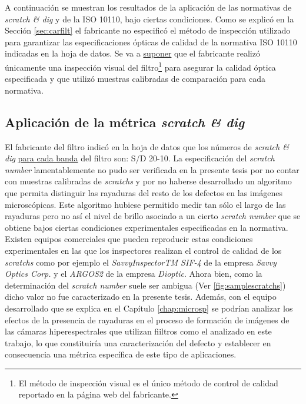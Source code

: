 A continuación se muestran los resultados de la aplicación de las normativas de \textit{scratch \& dig} y de la ISO 10110, bajo ciertas condiciones. Como se explicó en la Sección \ref{sec:carfilt} el fabricante no especificó el método de inspección utilizado para garantizar las especificaciones ópticas de calidad de la normativa ISO 10110 indicadas en la hoja de datos. Se va a \underline{suponer} que el fabricante realizó únicamente una inspección visual del filtro\footnote{El método de inspección visual es el único método de control de calidad reportado en la página web del fabricante.} para asegurar la calidad óptica especificada y que utilizó muestras calibradas de comparación para cada normativa.

\singlespacing
\subsection{Aplicación de la métrica \textit{scratch \& dig}}

\hspace{0.5cm}El fabricante del filtro indicó en la hoja de datos que los números de \textit{scratch \& dig} \underline{para cada banda} del filtro son: S/D 20-10. La especificación del \textit{scratch number} lamentablemente no pudo ser verificada en la presente tesis por no contar con muestras calibradas de \textit{scratchs} y por no haberse desarrollado un algoritmo que permita distinguir las rayaduras del resto de los defectos en las imágenes microscópicas. Este algoritmo hubiese permitido medir tan sólo el largo de las rayaduras pero no así el nivel de brillo asociado a un cierto \textit{scratch number} que se obtiene bajos ciertas condiciones experimentales especificadas en la normativa. Existen equipos comerciales que pueden reproducir estas condiciones experimentales en las que los inspectores realizan el control de calidad de los \textit{scratchs} como por ejemplo el \textit{SavvyInspectorTM SIF-4} de la empresa \textit{Savvy Optics Corp.} y el \textit{ARGOS2} de la empresa \textit{Dioptic}. Ahora bien, como la determinación del \textit{scratch number} suele ser ambigua (Ver \ref{fig:samplescratchs}) dicho valor no fue caracterizado en la presente tesis. Además, con el equipo desarrollado que se explica en el Capítulo \ref{chap:microsp} se podrían analizar los efectos de la presencia de rayaduras en el proceso de formación de imágenes de las cámaras hiperespectrales que utilizan fiiltros como el analizado en este trabajo, lo que constituiría una caracterización del defecto y establecer en consecuencia una métrica específica de este tipo de aplicaciones.


